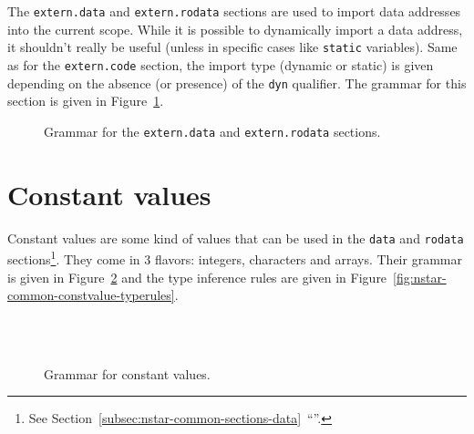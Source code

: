 The \texttt{extern.data} and \texttt{extern.rodata} sections are used to import data addresses into the current scope.
While it is possible to dynamically import a data address, it shouldn't really be useful (unless in specific cases like \texttt{static} variables).
Same as for the \texttt{extern.code} section, the import type (dynamic or static) is given depending on the absence (or presence) of the \texttt{dyn} qualifier.
The grammar for this section is given in Figure~\ref{fig:nstar-common-sections-extern-data-grammar}.

\begin{figure}[htb]
  \centering

  \caption{Grammar for the \texttt{extern.data} and \texttt{extern.rodata} sections.}
  \label{fig:nstar-common-sections-extern-data-grammar}
\end{figure}

\section{Constant values}\label{sec:nstar-common-constvalue}

Constant values are some kind of values that can be used in the \texttt{data} and \texttt{rodata} sections\footnote{See Section~\ref{subsec:nstar-common-sections-data}~``''.}.
They come in 3 flavors: integers, characters and arrays.
Their grammar is given in Figure~\ref{fig:nstar-common-constvalue-grammar} and the type inference rules are given in Figure~\ref{fig:nstar-common-constvalue-typerules}.

\begin{figure}[htb]
  \centering
  \\
  \\

  \caption{Grammar for constant values.}
  \label{fig:nstar-common-constvalue-grammar}
\end{figure}

